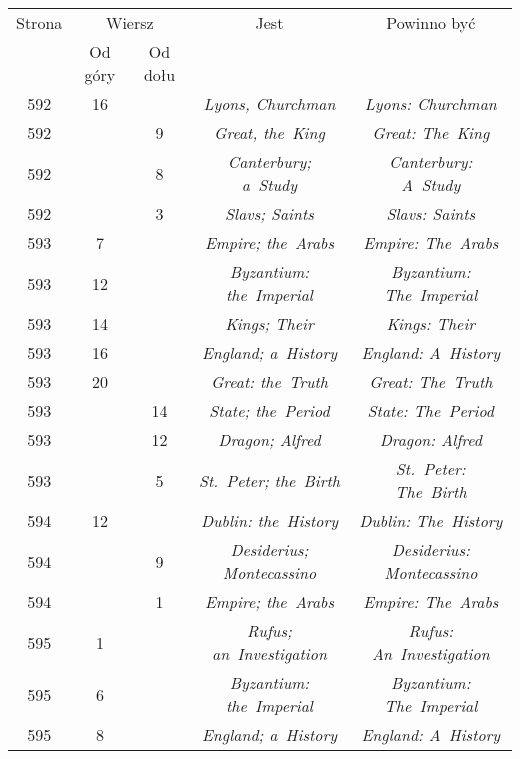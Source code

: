 \documentclass[a4paper,11pt]{article}
\numberwithin{equation}{section}
\begin{document}
\begin{center}
  \begin{tabular}{|c|c|c|c|c|}
    \hline
    Strona & \multicolumn{2}{c|}{Wiersz}& Jest
                              & Powinno być \\ \cline{2-3}
    & Od góry & Od dołu & & \\
    \hline
    592 & 16 & & \textit{Lyons, Churchman} & \textit{Lyons: Churchman} \\
    592 & & \hphantom{0}9 & \textit{Great, the~King}
    & \textit{Great: The~King} \\
    592 & & \hphantom{0}8 & \textit{Canterbury; a~Study}
           & \textit{Canterbury: A~Study} \\
    592 & & \hphantom{0}3 & \textit{Slavs; Saints}
    & \textit{Slavs: Saints} \\
    593 & \hphantom{0}7 & & \textit{Empire; the~Arabs}
    & \textit{Empire: The~Arabs} \\
    593 & 12 & & \textit{Byzantium: the~Imperial}
           & \textit{Byzantium: The~Imperial} \\
    593 & 14 & & \textit{Kings; Their} & \textit{Kings: Their} \\
    593 & 16 & & \textit{England; a~History}
           & \textit{England: A~History} \\
    593 & 20 & & \textit{Great: the~Truth} & \textit{Great: The~Truth} \\
    593 & & 14 & \textit{State; the~Period} & \textit{State: The~Period} \\
    593 & & 12 & \textit{Dragon; Alfred} & \textit{Dragon: Alfred} \\
    593 & & \hphantom{0}5 & \textit{St.~Peter; the~Birth}
           & \textit{St.~Peter: The~Birth} \\
    594 & 12 & & \textit{Dublin: the~History}
           & \textit{Dublin: The~History} \\
    594 & & \hphantom{0}9 & \textit{Desiderius; Montecassino}
           & \textit{Desiderius: Montecassino} \\
    594 & & \hphantom{0}1 & \textit{Empire; the~Arabs}
    & \textit{Empire: The~Arabs} \\
    595 & \hphantom{0}1 & & \textit{Rufus; an~Investigation}
           & \textit{Rufus: An~Investigation} \\
    595 & \hphantom{0}6 & & \textit{Byzantium: the~Imperial}
           & \textit{Byzantium: The~Imperial} \\
    595 & \hphantom{0}8 & & \textit{England; a~History}
           & \textit{England: A~History} \\

\end{tabular}
\end{center}
\end{document}
